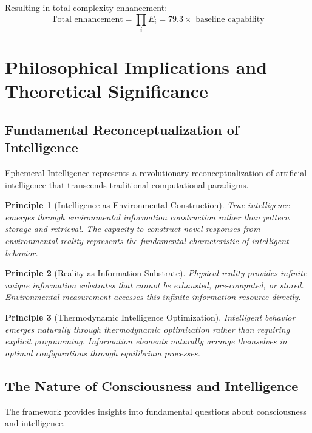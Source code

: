 \documentclass[12pt,a4paper]{article}
\newtheorem{principle}{Principle}
\begin{document}
Resulting in total complexity enhancement:
\begin{equation}
\text{Total enhancement} = \prod_{i} E_i = 79.3\times \text{ baseline capability}
\end{equation}

\section{Philosophical Implications and Theoretical Significance}

\subsection{Fundamental Reconceptualization of Intelligence}

Ephemeral Intelligence represents a revolutionary reconceptualization of artificial intelligence that transcends traditional computational paradigms.

\begin{principle}[Intelligence as Environmental Construction]
True intelligence emerges through environmental information construction rather than pattern storage and retrieval. The capacity to construct novel responses from environmental reality represents the fundamental characteristic of intelligent behavior.
\end{principle}

\begin{principle}[Reality as Information Substrate]
Physical reality provides infinite unique information substrates that cannot be exhausted, pre-computed, or stored. Environmental measurement accesses this infinite information resource directly.
\end{principle}

\begin{principle}[Thermodynamic Intelligence Optimization]
Intelligent behavior emerges naturally through thermodynamic optimization rather than requiring explicit programming. Information elements naturally arrange themselves in optimal configurations through equilibrium processes.
\end{principle}

\subsection{The Nature of Consciousness and Intelligence}

The framework provides insights into fundamental questions about consciousness and intelligence.
\end{document}

